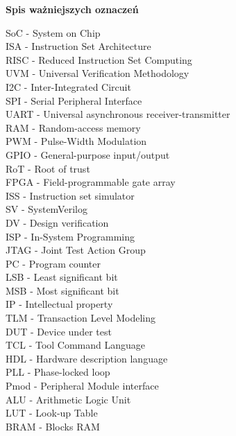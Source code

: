 \documentclass[11pt,a4paper]{article}
\begin{document}
\newpage
\begin{flushleft}
\begin{Large}
\textbf {Spis ważniejszych oznaczeń}\newline

\end{Large}

SoC - System on Chip
\\ISA - Instruction Set Architecture
\\RISC - Reduced Instruction Set Computing
\\UVM - Universal Verification Methodology
\\I2C - Inter-Integrated Circuit
\\SPI - Serial Peripheral Interface
\\UART - Universal asynchronous receiver-transmitter
\\RAM - Random-access memory
\\PWM - Pulse-Width Modulation
\\GPIO - General-purpose input/output
\\RoT - Root of trust
\\FPGA - Field-programmable gate array
\\ISS - Instruction set simulator
\\SV - SystemVerilog
\\DV - Design verification
\\ISP - In-System Programming
\\JTAG - Joint Test Action Group
\\PC - Program counter
\\LSB - Least significant bit
\\MSB - Most significant bit
\\IP - Intellectual property
\\TLM - Transaction Level Modeling
\\DUT - Device under test
\\TCL - Tool Command Language
\\HDL - Hardware description language
\\PLL - Phase-locked loop
\\Pmod - Peripheral Module interface
\\ALU - Arithmetic Logic Unit 
\\LUT - Look-up Table
\\BRAM - Blocks RAM
\end{flushleft}
\vspace{0.5cm}


\newpage
\end{document}
